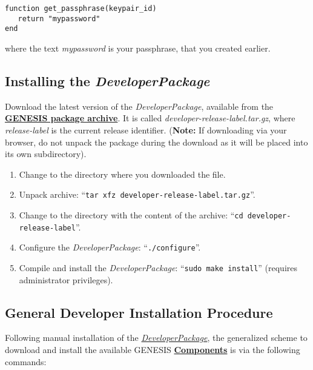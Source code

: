 \documentclass[12pt]{article}
\begin{document}
\begin{verbatim}
function get_passphrase(keypair_id)	
   return "mypassword"
end
\end{verbatim}

where the text {\it mypassword} is your passphrase, that you created earlier. 


\subsection*{Installing the {\it DeveloperPackage}}

Download the latest version of the {\it DeveloperPackage}, available from the \href{http://repo-genesis3.cbi.utsa.edu/src/}{\bf GENESIS package archive}.  It is called {\it developer-release-label.tar.gz}, where {\it release-label} is the current release identifier. ({\bf Note:} If downloading via your browser, do not unpack the package during the download as it will be placed into its own subdirectory).
\begin{enumerate}
   \item Change to the directory where you downloaded the file.
   \item Unpack archive: ``{\tt tar xfz developer-release-label.tar.gz}''.
   \item Change to the directory with the content of the archive: ``{\tt cd developer-release-label}''.
   \item Configure the {\it DeveloperPackage}: ``{\tt ./configure}''.
   \item Compile and install the {\it DeveloperPackage}: ``{\tt sudo make install}'' (requires administrator privileges).
\end{enumerate}

\subsection*{General Developer Installation Procedure}

Following manual installation of the \href{../developer-package/developer-package.tex}{\it DeveloperPackage}, the generalized scheme to download and install the available GENESIS \href{../reserved-words/reserved-words.tex}{\bf Components} is via the following commands:
\end{document}
